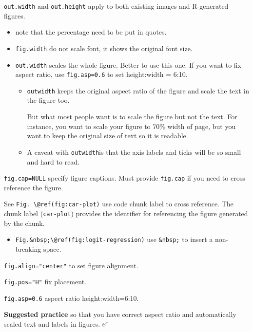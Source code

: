 \documentclass[
  a4paper,
  twoside,
  openright]{book}
\providecommand{\tightlist}{%
  \setlength{\itemsep}{0pt}\setlength{\parskip}{0pt}}
\theoremstyle{definition}
\theoremstyle{definition}
\theoremstyle{definition}
\theoremstyle{definition}
\theoremstyle{remark}
\begin{document}
\texttt{out.width} and \texttt{out.height} apply to both existing images and R-generated figures.

\begin{itemize}
\item
  note that the percentage need to be put in quotes.
\item
  \texttt{fig.width} do not scale font, it shows the original font size.
\item
  \texttt{out.width} scales the whole figure. Better to use this one. If you want to fix aspect ratio, use \texttt{fig.asp=0.6} to set height:width = 6:10.

  \begin{itemize}
  \item
    \texttt{outwidth} keeps the original aspect ratio of the figure and scale the text in the figure too.

    But what most people want is to scale the figure but not the text. For instance, you want to scale your figure to 70\% width of page, but you want to keep the original size of text so it is readable.
  \item
    A caveat with \texttt{outwidth}is that the {axis labels and ticks will be so small} and hard to read.
  \end{itemize}
\end{itemize}

\texttt{fig.cap=NULL} specify figure captions. Must provide \texttt{fig.cap} if you need to cross reference the figure.

See {\texttt{Fig.\ \textbackslash{}@ref(fig:car-plot)}} use code chunk label to cross reference. The chunk label (\texttt{car-plot}) provides the identifier for referencing the figure generated by the chunk.

\begin{itemize}
\tightlist
\item
  \texttt{Fig.\&nbsp;\textbackslash{}@ref(fig:logit-regression)} use \texttt{\&nbsp;} to insert a {non-breaking space}.
\end{itemize}

{\texttt{fig.align="center"}} to set figure alignment.

\texttt{fig.pos="H"} fix placement.

\texttt{fig.asp=0.6} aspect ratio height:width=6:10.

{\textbf{Suggested practice}} so that you have correct aspect ratio and automatically scaled text and labels in figures. ✅
\end{document}
